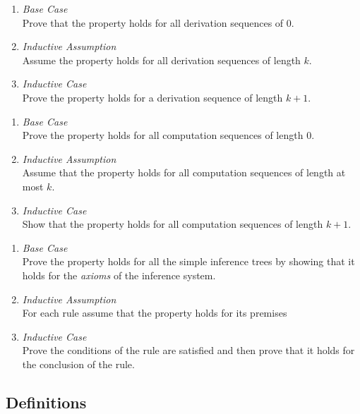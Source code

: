 \documentclass[11pt,a4paper]{article}
\begin{document}
\begin{enumerate}
	\item \textit{Base Case}\\Prove that the property holds for all derivation sequences of $0$.
	\item \textit{Inductive Assumption}\\Assume the property holds for all derivation sequences of length $k$.
	\item \textit{Inductive Case}\\Prove the property holds for a derivation sequence of length $k+1$.
\end{enumerate}

\begin{enumerate}
	\item \textit{Base Case}\\Prove the property holds for all computation sequences of length $0$.
	\item \textit{Inductive Assumption}\\Assume that the property holds for all computation sequences of length at most $k$.
	\item \textit{Inductive Case}\\Show that the property holds for all computation sequences of length $k+1$.
\end{enumerate}

\begin{enumerate}
	\item \textit{Base Case}\\Prove the property holds for all the simple inference trees by showing that it holds for the \textit{axioms} of the inference system.
	\item \textit{Inductive Assumption}\\For each rule assume that the property holds for its premises
	\item \textit{Inductive Case}\\Prove the conditions of the rule are satisfied and then prove that it holds for the conclusion of the rule.
\end{enumerate}

\subsection{Definitions}
\end{document}
